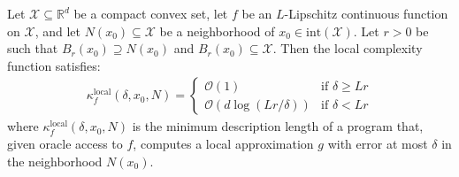 \documentclass[10pt,a4paper]{amsart}
\begin{document}
\begin{theorem}
\label{thm:local-complexity}
Let $\mathcal{X} \subseteq \mathbb{R}^d$ be a compact convex set, let $f$ be an $L$-Lipschitz continuous function on $\mathcal{X}$, and let $N(x_0) \subseteq \mathcal{X}$ be a neighborhood of $x_0 \in \mathrm{int}(\mathcal{X})$. Let $r > 0$ be such that $B_r(x_0) \supseteq N(x_0)$ and $B_r(x_0) \subseteq \mathcal{X}$. Then the local complexity function satisfies:
\begin{align}
\kappa_f^{\text{local}}(\delta, x_0, N) = 
\begin{cases}
\mathcal{O}(1) & \text{if } \delta \geq Lr \\
\mathcal{O}(d \log(Lr/\delta)) & \text{if } \delta < Lr
\end{cases}
\end{align}
where $\kappa_f^{\text{local}}(\delta, x_0, N)$ is the minimum description length of a program that, given oracle access to $f$, computes a local approximation $g$ with error at most $\delta$ in the neighborhood $N(x_0)$.
\end{theorem}
\end{document}
